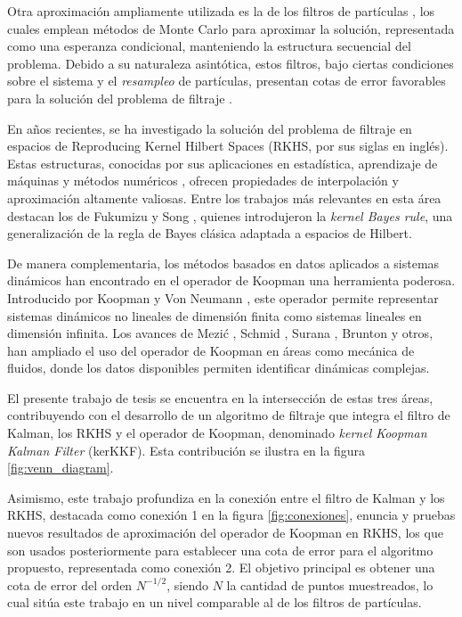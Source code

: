 Otra aproximación ampliamente utilizada es la de los filtros de partículas \cite{Hammersley1954PoorCarlo, Liu1998SequentialSystems}, los cuales emplean métodos de Monte Carlo para aproximar la solución, representada como una esperanza condicional, manteniendo la estructura secuencial del problema. Debido a su naturaleza asintótica, estos filtros, bajo ciertas condiciones sobre el sistema y el \textit{resampleo} de partículas, presentan cotas de error favorables para la solución del problema de filtraje \cite{Crisan2002APractitioners}.

En años recientes, se ha investigado la solución del problema de filtraje en espacios de Reproducing Kernel Hilbert Spaces (RKHS, por sus siglas en inglés). Estas estructuras, conocidas por sus aplicaciones en estadística, aprendizaje de máquinas y métodos numéricos \cite{Wendland2004ScatteredApproximation, Christmann2008SupportMachines}, ofrecen propiedades de interpolación y aproximación altamente valiosas. Entre los trabajos más relevantes en esta área destacan los de Fukumizu y Song \cite{Fukumizu2004DimensionalitySpaces, Song2009HilbertSystems}, quienes introdujeron la \textit{kernel Bayes rule}, una generalización de la regla de Bayes clásica adaptada a espacios de Hilbert.

De manera complementaria, los métodos basados en datos aplicados a sistemas dinámicos han encontrado en el operador de Koopman una herramienta poderosa. Introducido por Koopman y Von Neumann \cite{Koopman1931HamiltonianSpace, Koopman1932DynamicalSpectra}, este operador permite representar sistemas dinámicos no lineales de dimensión finita como sistemas lineales en dimensión infinita. Los avances de Mezić \cite{Mezic2013AnalysisOperator}, Schmid \cite{Schmid2008DynamicData}, Surana \cite{Surana2016KoopmanSystems}, Brunton \cite{Brunton2016KoopmanControl} y otros, han ampliado el uso del operador de Koopman en áreas como mecánica de fluidos, donde los datos disponibles permiten identificar dinámicas complejas.

El presente trabajo de tesis se encuentra en la intersección de estas tres áreas, contribuyendo con el desarrollo de un algoritmo de filtraje que integra el filtro de Kalman, los RKHS y el operador de Koopman, denominado \textit{kernel Koopman Kalman Filter} (kerKKF). Esta contribución se ilustra en la figura \ref{fig:venn_diagram}.

Asimismo, este trabajo profundiza en la conexión entre el filtro de Kalman y los RKHS, destacada como conexión 1 en la figura \ref{fig:conexiones}, enuncia y pruebas nuevos resultados de aproximación del operador de Koopman en RKHS, los que son usados posteriormente para establecer una cota de error para el algoritmo propuesto, representada como conexión 2. El objetivo principal es obtener una cota de error del orden $N^{-1/2}$, siendo $N$ la cantidad de puntos muestreados, lo cual sitúa este trabajo en un nivel comparable al de los filtros de partículas.

